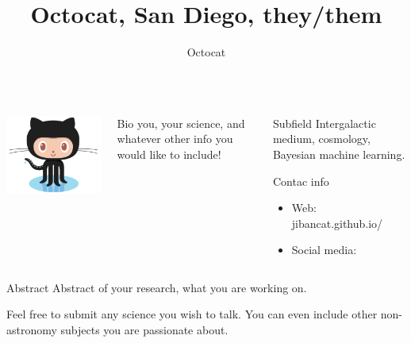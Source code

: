 \documentclass{beamer}
\author[Octocat@ucsd.edu]{Octocat}
\title{Octocat, San Diego, they/them}
\institute{UC San Diego}
\begin{document}
\begin{frame}[fragile]
  \begin{columns}[T]

    \begin{column}{.33\textwidth}
      
      \begin{block}{}
        \begin{center}
          \includegraphics[width=8cm]{images/Octocat.png}
        \end{center}
      \end{block}
    \end{column}

    \begin{column}{.40\textwidth}

      \begin{block}{Bio}
        you, your science, and whatever other info you would like to include!
      \end{block}
    \end{column}

    \begin{column}{.20\textwidth}
      \begin{block}{Subfield}
        Intergalactic medium, cosmology, Bayesian machine learning.
      \end{block}
      \begin{block}{Contac info}    
        \begin{itemize}
          \item Web: jibancat.github.io/
          \item Social media:
        \end{itemize}
      \end{block}
  
  \end{column}

  \end{columns}

  \begin{block}{Abstract}
    Abstract of your research, what you are working on.

    Feel free to submit any science you wish to talk. You can even include other non-astronomy subjects you are passionate about.
  \end{block}


\end{frame}
\end{document}
